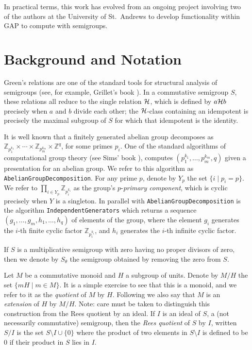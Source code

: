 \documentclass[12pt]{article}
\def\gap{\sf GAP}
\begin{document}
In practical terms, this work has evolved from an 
ongoing project involving two of the authors
\cite{braga99} at the University of St.~Andrews to 
develop functionality within {\gap} \cite{gap} to compute with 
semigroups. 

\section{Background and Notation}

Green's relations are one of the  standard tools for 
structural analysis of semigroups (see, for example, Grillet's 
book \cite{Grillet:book}). In a commutative semigroup $S$, these 
relations all reduce to the single relation ${\cal H}$, which is 
defined by $a {\cal H} b$ precisely when $a$ and $b$ divide each 
other; the ${\cal H}$-class containing an idempotent 
is precisely the maximal subgroup  of $S$ for which that idempotent 
is the identity.

It is well known that a finitely generated abelian group decomposes
as $\mathbb{Z}_{p_1^{k_1}} \times \cdots \times \mathbb{Z}_{p_m^{k_m}} 
\times \mathbb{Z}^q$, for some primes $p_i$.
One of the standard algorithms of computational
group theory (see Sims' book \cite{sims}), computes
$(p_1^{k_1}, \ldots, p_m^{k_m}, q)$ given a presentation for an 
abelian group. We refer to this algorithm as {\tt AbelianGroupDecomposition}.
For any prime $p$, denote by $Y_p$ the set $\{ i \mid p_i = p\}$. 
We refer to $\prod_{i \in Y_p}\mathbb{Z}_{p_i^{k_i}}$ as the  group's 
$p$-{\em primary component}, which is cyclic precisely when $Y$ 
is a singleton.  In parallel with {\tt AbelianGroupDecomposition}
is the algorithm {\tt IndependentGenerators} which returns a sequence
$(g_1, \ldots, g_m, h_1, \ldots, h_q)$ of elements of the group,
where the element $g_i$ generates the $i$-th finite 
cyclic factor $\mathbb{Z}_{p_i^{k_i}}$, and $h_i$ generates 
the $i$-th infinite cyclic factor.

If $S$ is a multiplicative semigroup with zero having no 
proper divisors of zero,
then we denote by $S_\theta$ the semigroup obtained by removing the
zero from $S$.

Let $M$ be a commutative monoid and $H$ a subgroup of units.
Denote by $M/H$ the set $\{mH \mid m \in M\}$. It is a simple exercise
to see that this is a monoid, and we refer to it as the 
{\em quotient} of $M$ by $H$. Following  \cite{pDJW91}
we also say that $M$ is an {\em extension} of $H$ by $M/H$.
Note: care must be taken to distinguish this construction from 
the Rees quotient by an ideal. If $I$ is an ideal of $S$, a (not necessarily
commutative) semigroup, then the \emph{Rees quotient} of $S$ by $I$, 
written $S/I$ is the set $S \setminus I \cup \{0\}$ where 
the product of two elements in  $S \setminus I$ 
is defined to be $0$ if their product in $S$ lies in $I$.
\end{document}
